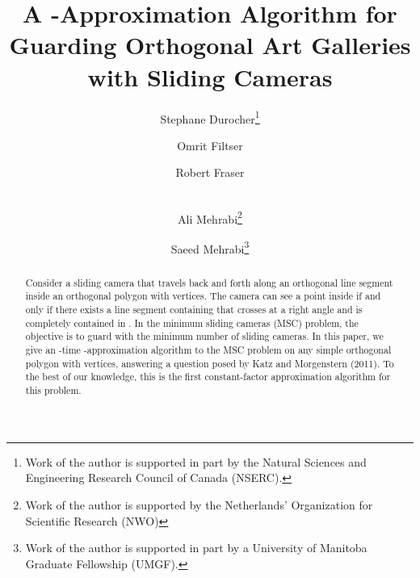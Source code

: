 \documentclass{llncs}
\begin{document}
\let\doendproof\endproof
\renewcommand\endproof{~\hfill\qed\doendproof}



\newcommand{\down}[1]{\raisebox{-.4ex}{#1}}



\makeatletter
    \renewcommand*{\@fnsymbol}[1]{\ensuremath{\ifcase#1\or *\or \dagger\or \S\or
       \mathsection\or \mathparagraph\or \|\or **\or \dagger\dagger
       \or \ddagger\ddagger \else\@ctrerr\fi}}
\makeatother

\newcommand*\samethanks[1][\value{footnote}]{\footnotemark[#1]}

\title{A \boldmath-Approximation Algorithm for Guarding Orthogonal Art
Galleries with Sliding Cameras}

\author{
Stephane Durocher\thanks{{Work of the author is supported in part by the Natural Sciences and Engineering Research Council of Canada
(NSERC).}} \and 	
Omrit Filtser\and
Robert Fraser\and\\
Ali Mehrabi\thanks{{Work of the author is supported by the Netherlands' Organization for Scientific Research (NWO)}}\and
Saeed Mehrabi\thanks{{Work of the author is supported in part by a University of Manitoba Graduate Fellowship (UMGF).}}
}




\newcommand{\keywords}[1]{\par\addvspace\baselineskip
\noindent\keywordname\enspace\ignorespaces#1}
\newtheorem{observation}{Observation}{\bfseries}{\itshape}

\pagestyle{plain}

\maketitle


\begin{abstract}
Consider a sliding camera that travels back and forth along
an orthogonal line segment  inside an orthogonal polygon  with  vertices. The camera can see a point  inside
 if and only if there exists a line segment containing  that crosses  at a right angle and 
is completely contained in . In the minimum sliding cameras (MSC)
problem, the objective is to guard  with the minimum number of sliding cameras.
In this paper, we give an -time -approximation algorithm to the
MSC problem on any simple orthogonal polygon with  vertices,
answering a question posed by Katz and Morgenstern (2011).
To the best of our knowledge, this is the first constant-factor approximation algorithm for this problem.
\end{abstract}
\end{document}
